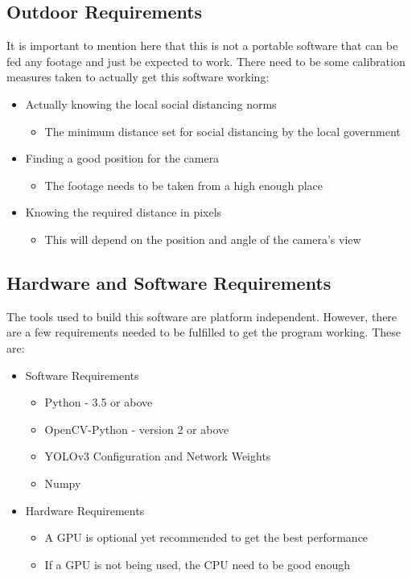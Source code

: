 \documentclass[a4paper]{article}
\begin{document}
\subsection{Outdoor Requirements}
It is important to mention here that this is not a portable software that can
be fed any footage and just be expected to work. There need to be some
calibration measures taken to actually get this software working:

\begin{itemize}
    \item Actually knowing the local social distancing norms
          \begin{itemize}
              \item The minimum distance set for social distancing by the local government
          \end{itemize}

    \item Finding a good position for the camera
          \begin{itemize}
              \item The footage needs to be taken from a high enough place
          \end{itemize}

    \item Knowing the required distance in pixels
          \begin{itemize}
              \item This will depend on the position and angle of the camera's view
          \end{itemize}
\end{itemize}

\subsection{Hardware and Software Requirements}
The tools used to build this software are platform independent. However,
there are a few requirements needed to be fulfilled to get the program
working. These are:

\begin{itemize}
    \item Software Requirements
          \begin{itemize}
              \item Python - 3.5 or above
              \item OpenCV-Python - version 2 or above
              \item YOLOv3 Configuration and Network Weights
              \item Numpy
          \end{itemize}

    \item Hardware Requirements
          \begin{itemize}
              \item A GPU is optional yet recommended to get the best performance
              \item If a GPU is not being used, the CPU need to be good enough
          \end{itemize}
\end{itemize}
\pagebreak
\end{document}

